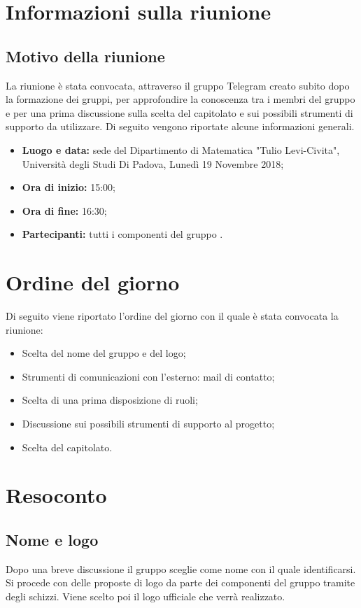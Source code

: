 \documentclass[a4paper,12pt]{article}
\begin{document}
	\cleardoublepage
	\pagestyle{mymain}
	
	\tableofcontents
	\cleardoublepage
	
	\section{Informazioni sulla riunione}
	\subsection{Motivo della riunione}
	La riunione è stata convocata, attraverso il gruppo Telegram creato subito dopo la formazione dei gruppi, per approfondire la conoscenza tra i membri del gruppo e per una prima discussione sulla scelta del capitolato e  sui possibili strumenti di supporto da utilizzare. 
	Di seguito vengono riportate alcune informazioni generali.
	\begin{itemize}
		\item \textbf{Luogo e data:} sede del Dipartimento di Matematica "Tulio Levi-Civita", Università degli Studi Di Padova, Lunedì 19 Novembre 2018;
		\item \textbf{Ora di inizio:} 15:00;
		\item \textbf{Ora di fine:} 16:30;
		\item \textbf{Partecipanti:} tutti i componenti del gruppo .
	\end{itemize}
	\section{Ordine del giorno}
	Di seguito viene riportato l'ordine del giorno con il quale è stata convocata la riunione:
	\begin{itemize}
		\item Scelta del nome del gruppo e del logo;
		\item Strumenti di comunicazioni con l'esterno: mail di contatto;
		\item Scelta di una prima disposizione di ruoli;
		\item Discussione sui possibili strumenti di supporto al progetto;
		\item Scelta del capitolato.
	\end{itemize}
	\section{Resoconto}
	\subsection{Nome e logo}
	Dopo una breve discussione il gruppo sceglie  come nome con il quale identificarsi.\\
	Si procede con delle proposte di logo da parte dei componenti del gruppo tramite degli schizzi. Viene scelto poi il logo ufficiale che verrà realizzato.
\end{document}
